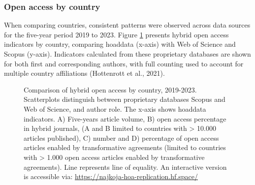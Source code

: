\documentclass[a4paper,man,floatsintext,longtable,noextraspace,10pt]{apa6}
\begin{document}
\subsubsection{Open access by country}\label{open-access-by-country}

When comparing countries, consistent patterns were observed across data
sources for the five-year period 2019 to 2023. Figure
\ref{fig-uptake_country} presents hybrid open access indicators by
country, comparing hoaddata (x-axis) with Web of Science and Scopus
(y-axis). Indicators calculated from these proprietary databases are
shown for both first and corresponding authors, with full counting used
to account for multiple country affiliations (Hottenrott et al., 2021).

\begin{figure}[ht!]


\caption{\label{fig-uptake_country}Comparison of hybrid open access by
country, 2019-2023. Scatterplots distinguish between proprietary
databases Scopus and Web of Science, and author role. The x-axis shows
hoaddata indicators. A) Five-years article volume, B) open access
percentage in hybrid journals, (A and B limited to countries with
\textgreater{} 10.000 articles published), C) number and D) percentage
of open access articles enabled by transformative agreements (limited to
countries with \textgreater{} 1.000 open access articles enabled by
transformative agreements). Line represents line of equality. An
interactive version is accessible via:
\url{https://najkoja-hoa-replication.hf.space/}}

\end{figure}%
\end{document}

